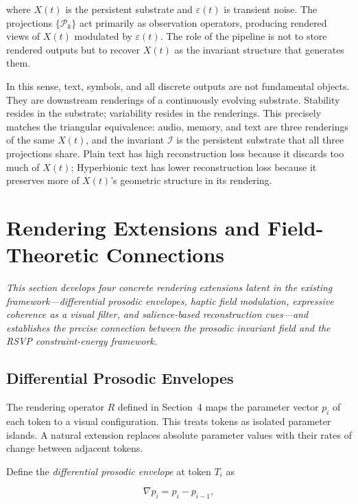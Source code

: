 \documentclass[12pt, a4paper]{article}
\begin{document}
where $X(t)$ is the persistent substrate and $\varepsilon(t)$ is transient noise. The projections $\{\mathcal{P}_k\}$ act primarily as observation operators, producing rendered views of $X(t)$ modulated by $\varepsilon(t)$. The role of the pipeline is not to store rendered outputs but to recover $X(t)$ as the invariant structure that generates them.

In this sense, text, symbols, and all discrete outputs are not fundamental objects. They are downstream renderings of a continuously evolving substrate. Stability resides in the substrate; variability resides in the renderings. This precisely matches the triangular equivalence: audio, memory, and text are three renderings of the same $X(t)$, and the invariant $\mathcal{I}$ is the persistent substrate that all three projections share. Plain text has high reconstruction loss because it discards too much of $X(t)$; Hyperbionic text has lower reconstruction loss because it preserves more of $X(t)$'s geometric structure in its rendering.


\section{Rendering Extensions and Field-Theoretic Connections}

\noindent\textit{This section develops four concrete rendering extensions latent in the existing framework---differential prosodic envelopes, haptic field modulation, expressive coherence as a visual filter, and salience-based reconstruction cues---and establishes the precise connection between the prosodic invariant field and the RSVP constraint-energy framework.}

\subsection{Differential Prosodic Envelopes}

The rendering operator $R$ defined in Section~4 maps the parameter vector $p_i$ of each token to a visual configuration. This treats tokens as isolated parameter islands. A natural extension replaces absolute parameter values with their rates of change between adjacent tokens.

Define the \emph{differential prosodic envelope} at token $T_i$ as

\begin{equation}
\nabla p_i = p_i - p_{i-1},
\label{eq:gradp}
\end{equation}
\end{document}
